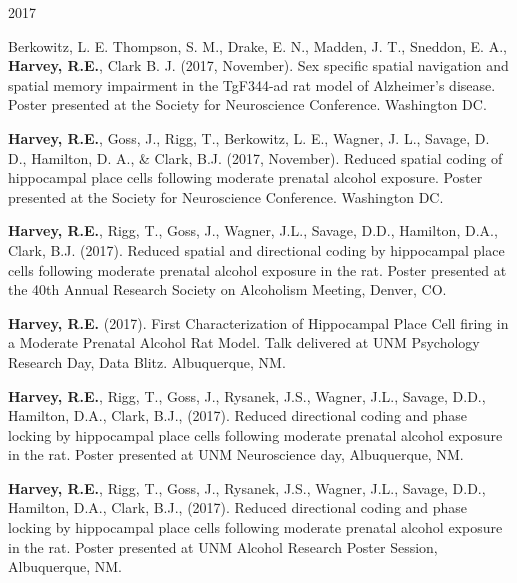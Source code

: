 \begin{cventries}
\cventry
    {} %
    {} %
    {} %
    {2017} %
    {
      \begin{cvitems} %
      \setlength\itemsep{0.35em}
        \item {Berkowitz, L. E. Thompson, S. M., Drake, E. N., Madden, J. T., Sneddon, E. A., \textbf{Harvey, R.E.}, Clark B. J. (2017, November). Sex specific spatial navigation and spatial memory impairment in the TgF344-ad rat model of Alzheimer’s disease. Poster presented at the Society for Neuroscience Conference. Washington DC.}
        \item {\textbf{Harvey, R.E.}, Goss, J., Rigg, T., Berkowitz, L. E., Wagner, J. L., Savage, D. D., Hamilton, D. A., \& Clark, B.J. (2017, November). Reduced spatial coding of hippocampal place cells following moderate prenatal alcohol exposure. Poster presented at the Society for Neuroscience Conference. Washington DC.}
        \item {\textbf{Harvey, R.E.}, Rigg, T., Goss, J., Wagner, J.L., Savage, D.D., Hamilton, D.A., Clark, B.J. (2017). Reduced spatial and directional coding by hippocampal place cells following moderate prenatal alcohol exposure in the rat. Poster presented at the 40th Annual Research Society on Alcoholism Meeting, Denver, CO.}
        \item {\textbf{Harvey, R.E.} (2017). First Characterization of Hippocampal Place Cell firing in a Moderate Prenatal Alcohol Rat Model. Talk delivered at UNM Psychology Research Day, Data Blitz. Albuquerque, NM.}
        \item {\textbf{Harvey, R.E.}, Rigg, T., Goss, J., Rysanek, J.S., Wagner, J.L., Savage, D.D., Hamilton, D.A., Clark, B.J., (2017). Reduced directional coding and phase locking by hippocampal place cells following moderate prenatal alcohol exposure in the rat. Poster presented at UNM Neuroscience day, Albuquerque, NM.}
        \item {\textbf{Harvey, R.E.}, Rigg, T., Goss, J., Rysanek, J.S., Wagner, J.L., Savage, D.D., Hamilton, D.A., Clark, B.J., (2017). Reduced directional coding and phase locking by hippocampal place cells following moderate prenatal alcohol exposure in the rat. Poster presented at UNM Alcohol Research Poster Session, Albuquerque, NM.}      
      \end{cvitems}
    }
\end{cventries}

